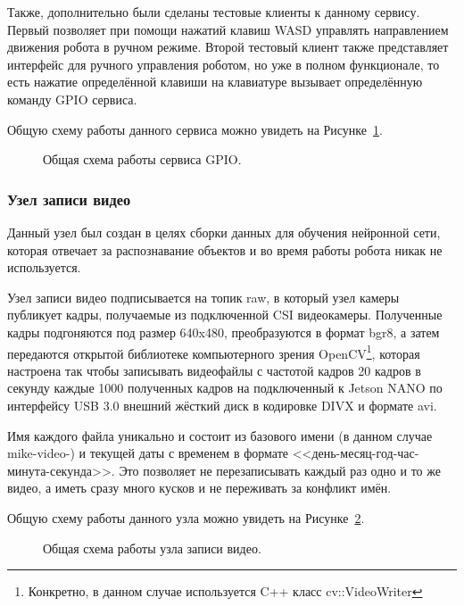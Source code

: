 Также, дополнительно были сделаны тестовые клиенты к данному сервису. Первый позволяет при помощи нажатий клавиш WASD управлять направлением движения робота в ручном режиме. Второй тестовый клиент также представляет интерфейс для ручного управления роботом, но уже в полном функционале, то есть нажатие определённой клавиши на клавиатуре вызывает определённую команду GPIO сервиса.

Общую схему работы данного сервиса можно увидеть на Рисунке~\ref{fig:service-gpio}.

\begin{figure}[ht]
  \caption{Общая схема работы сервиса GPIO.}\label{fig:service-gpio}
\end{figure}

\subsubsection{Узел записи видео}
Данный узел был создан в целях сборки данных для обучения нейронной сети, которая отвечает за распознавание объектов и во время работы робота никак не используется. 

Узел записи видео подписывается на топик raw, в который узел камеры публикует кадры, получаемые из подключенной CSI видеокамеры. Полученные кадры подгоняются под размер 640x480, преобразуются в формат bgr8, а затем передаются открытой библиотеке компьютерного зрения OpenCV\footnote{Конкретно, в данном случае используется C++ класс cv::VideoWriter}, которая настроена так чтобы записывать видеофайлы с частотой кадров 20 кадров в секунду каждые 1000 полученных кадров на подключенный к Jetson NANO по интерфейсу USB 3.0 внешний жёсткий диск в кодировке DIVX и формате avi. 

Имя каждого файла уникально и состоит из базового имени (в данном случае mike-video-) и текущей даты с временем в формате <<день-месяц-год-час-минута-секунда>>. Это позволяет не перезаписывать каждый раз одно и то же видео, а иметь сразу много кусков и не переживать за конфликт имён. 

Общую схему работы данного узла можно увидеть на Рисунке~\ref{fig:node-recorder}.

\begin{figure}[ht]
  \caption{Общая схема работы узла записи видео.}\label{fig:node-recorder}
\end{figure}

